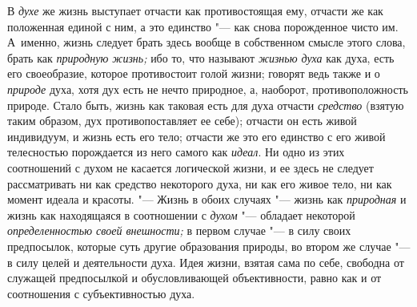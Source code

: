 В {\em духе} же жизнь выступает отчасти как противостоящая ему, отчасти же
как положенная единой с ним, а это единство "--- как снова
порожденное чисто им. А~именно, жизнь следует брать здесь вообще в
собственном смысле этого слова, брать как
{\em природную жизнь;} ибо то, что называют {\em жизнью духа} как
духа, есть его своеобразие, которое противостоит голой жизни; говорят ведь
также и о {\em природе}
духа, хотя дух есть не нечто природное, а, наоборот,
противоположность природе. Стало быть, жизнь как таковая есть для духа
отчасти {\em средство}
(взятую таким образом, дух противопоставляет ее себе);
отчасти он есть живой индивидуум, и жизнь есть его тело; отчасти же это его
единство с его живой телесностью порождается из него самого как
{\em идеал}. Ни одно из
этих соотношений с духом не касается логической жизни, и ее здесь не
следует рассматривать ни как средство некоторого духа, ни как его живое
тело, ни как момент идеала и красоты. "--- Жизнь в обоих
случаях "--- жизнь как {\em природная} и жизнь
как находящаяся в соотношении с {\em духом} "--- обладает
некоторой {\em определенностью своей
внешности;} в первом случае "--- в силу своих
предпосылок, которые суть другие образования природы, во втором же случае
"--- в силу целей и деятельности духа. Идея жизни, взятая сама
по себе, свободна от служащей предпосылкой и обусловливающей объективности,
равно как и от соотношения с субъективностью духа.


